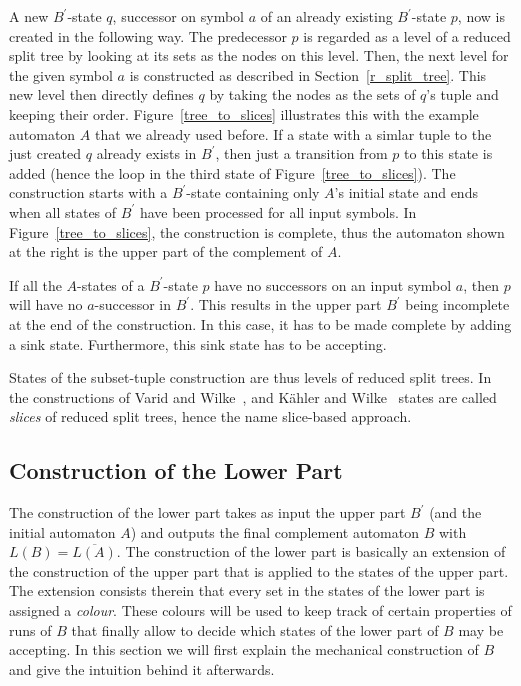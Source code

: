 \documentclass[a4paper]{report}
\newcommand{\c}[1]{\overline{#1}}
\begin{document}
A new $B^\prime$-state $q$, successor on symbol $a$ of an already existing $B^\prime$-state $p$, now is created in the following way. The predecessor $p$ is regarded as a level of a reduced split tree by looking at its sets as the nodes on this level. Then, the next level for the given symbol $a$ is constructed as described in Section~\ref{r_split_tree}. This new level then directly defines $q$ by taking the nodes as the sets of $q$'s tuple and keeping their order. Figure~\ref{tree_to_slices} illustrates this with the example automaton $A$ that we already used before. If a state with a simlar tuple to the just created $q$ already exists in $B^\prime$, then just a transition from $p$ to this state is added (hence the loop in the third state of Figure~\ref{tree_to_slices}). The construction starts with a $B^\prime$-state containing only $A$'s initial state and ends when all states of $B^\prime$ have been processed for all input symbols. In Figure~\ref{tree_to_slices}, the construction is complete, thus the automaton shown at the right is the upper part of the complement of $A$.

If all the $A$-states of a $B^\prime$-state $p$ have no successors on an input symbol $a$, then $p$ will have no $a$-successor in $B^\prime$. This results in the upper part $B^\prime$ being incomplete at the end of the construction. In this case, it has to be made complete by adding a sink state. Furthermore, this sink state has to be accepting.

States of the subset-tuple construction are thus levels of reduced split trees. In the constructions of Varid and Wilke~\cite{vardi2007automata}, and Kähler and Wilke~\cite{2008_kaehler} states are called \emph{slices} of reduced split trees, hence the name slice-based approach.


\subsection{Construction of the Lower Part}
The construction of the lower part takes as input the upper part $B^\prime$ (and the initial automaton $A$) and outputs the final complement automaton $B$ with $L(B) = \c{L(A)}$. The construction of the lower part is basically an extension of the construction of the upper part that is applied to the states of the upper part. The extension consists therein that every set in the states of the lower part is assigned a \emph{colour}. These colours will be used to keep track of certain properties of runs of $B$ that finally allow to decide which states of the lower part of $B$ may be accepting. In this section we will first explain the mechanical construction of $B$ and give the intuition behind it afterwards.
\end{document}

